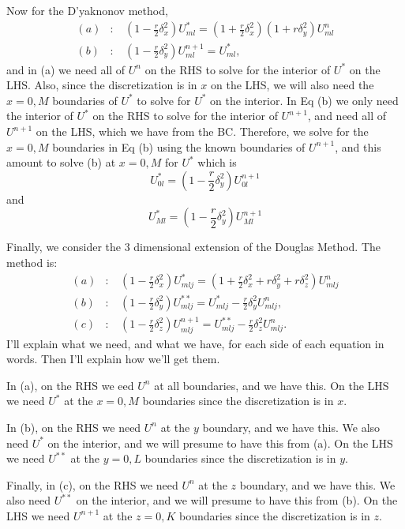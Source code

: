 \documentclass[11pt]{article}
\def\f{\frac }
\begin{document}
\begin{enumerate}
Now for the D'yaknonov method,
\begin{align*} (a) &: ~~~~ \left ( 1 - \f{r}{2}\delta _x ^2 \right ) U^* _{ml} = \left ( 1  + \f{r}{2} \delta _x ^2 \right ) \left ( 1 + r \delta _y ^2 \right ) U^n _{ml} \\
(b) &: ~~~~ \left ( 1 - \f{r}{2}\delta _y ^2  \right ) U^{n+1}  _{ml} = U^* _{ml}, \end{align*} 
and in (a) we need all of $U^n$ on the RHS to solve for the interior of $U^*$ on the LHS.
Also, since the discretization is in $x$ on the LHS, we will also need the $x=0,M$ boundaries of $U^*$ to solve for $U^*$ on the interior.
In Eq (b) we only need the interior of $U^*$ on the RHS to solve for the interior of $U^{n+1}$, and need all of $U^{n+1}$ on the LHS, which we have from the BC.
Therefore, we solve for the $x=0,M$ boundaries in Eq (b) using the known boundaries of $U^{n+1}$, and this amount to solve (b) at $x=0,M$ for $U^*$ which is
\[ U^* _{0l} = \left ( 1 - \f{r}{2}\delta _y ^2  \right ) U^{n+1}  _{0l} \]
and 
\[ U^* _{Ml} = \left ( 1 - \f{r}{2}\delta _y ^2  \right ) U^{n+1}  _{Ml} \]

Finally, we consider the 3 dimensional extension of the Douglas Method.
The method is:
\begin{align*} (a) &: ~~~~ \left ( 1 - \f{r}{2}\delta _x ^2 \right ) U^* _{mlj} = \left ( 1  + \f{r}{2} \delta _x ^2 + r \delta _y ^2 + r \delta _z ^2 \right ) U^n _{mlj} \\
(b) &: ~~~~ \left ( 1 - \f{r}{2}\delta _y ^2  \right ) U^{**}  _{mlj} = U^* _{mlj} - \f{r}{2} \delta _y ^2 U^n _{mlj}, \\
(c) &: ~~~~ \left ( 1 - \f{r}{2}\delta _z ^2  \right ) U^{n+1}  _{mlj} = U^{**} _{mlj} - \f{r}{2} \delta _z ^2 U^n _{mlj}. \end{align*} 
I'll explain what we need, and what we have, for each side of each equation in words.
Then I'll explain how we'll get them.

In (a), on the RHS we eed $U^n$ at all boundaries, and we have this.
On the LHS we need $U^*$ at the $x=0,M$ boundaries since the discretization is in $x$.

In (b), on the RHS we need $U^n$ at the $y$ boundary, and we have this.
We also need $U^*$ on the interior, and we will presume to have this from (a).
On the LHS we need $U^{**}$ at the $y=0,L$ boundaries since the discretization is in $y$.

Finally, in (c), on the RHS we need $U^n$ at the $z$ boundary, and we have this.
We also need $U^{**}$ on the interior, and we will presume to have this from (b).
On the LHS we need $U^{n+1}$ at the $z=0,K$ boundaries since the discretization is in $z$.


\end{enumerate}
\end{document}
